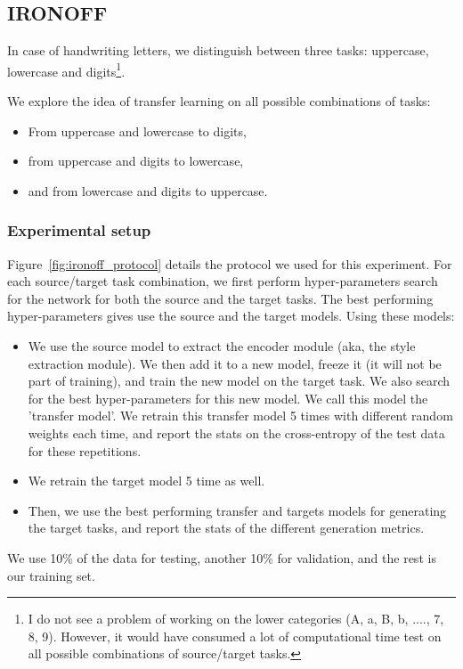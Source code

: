   \subsection{IRONOFF}
    \par In case of handwriting letters, we distinguish between three tasks: uppercase, lowercase and digits\footnote{I do not see a problem of working on the lower categories (A, a, B, b, ...., 7, 8, 9). However, it would have consumed a lot of computational time test on all possible combinations of source/target tasks.}.
    \par We explore the idea of transfer learning on all possible combinations of tasks:
    \begin{itemize}
      \item From uppercase and lowercase to digits,
      \item from uppercase and digits to lowercase,
      \item and from lowercase and digits to uppercase.
    \end{itemize}

    \subsubsection{Experimental setup}
      \par Figure~\ref{fig:ironoff_protocol} details the protocol we used for this experiment. For each source/target task combination, we first perform hyper-parameters search for the network for both the source and the target tasks. The best performing hyper-parameters gives use the source and the target models. Using these models:
      \begin{itemize}
        \item We use the source model to extract the encoder module (aka, the style extraction module). We then add it to a new model, freeze it (it will not be part of training), and train the new model on the target task. We also search for the best hyper-parameters for this new model. We call this model the 'transfer model'. We retrain this transfer model 5 times with different random weights each time, and report the stats on the cross-entropy of the test data for these repetitions.
        \item We retrain the target model 5 time as well.
        \item Then, we use the best performing transfer and targets models for generating the target tasks, and report the stats of the different generation metrics.
      \end{itemize}
      \par We use 10\% of the data for testing, another 10\% for validation, and the rest is our training set.

